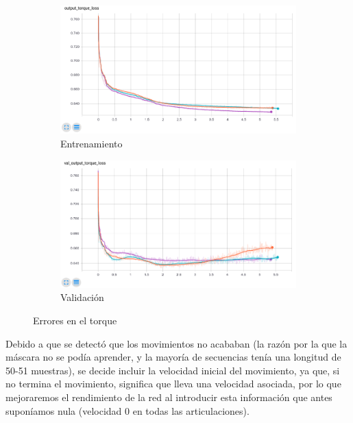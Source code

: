 \begin{figure}[]
	\begin{subfigure}{0.45\textwidth}
		\centering
		\includegraphics[width=\linewidth]{imagenes/resultados/torque_final.png}
		\caption{Entrenamiento}
		\label{fig:resultados/torque_final}
	\end{subfigure}
	\begin{subfigure}{0.45\textwidth}
		\centering
		\includegraphics[width=\linewidth]{imagenes/resultados/val_torque_final.png}
		\caption{Validación}
		\label{fig:resultados/val_torque_final}
	\end{subfigure}
	\caption{Errores en el torque}
	\label{fig:resultados/final}
\end{figure}

Debido a que se detectó que los movimientos no acababan (la razón por la que la máscara no se podía aprender, y la mayoría de secuencias tenía una longitud de 50-51 muestras), se decide incluir la velocidad inicial del movimiento, ya que, si no termina el movimiento, significa que lleva una velocidad asociada, por lo que mejoraremos el rendimiento de la red al introducir esta información que antes suponíamos nula (velocidad 0 en todas las articulaciones).


